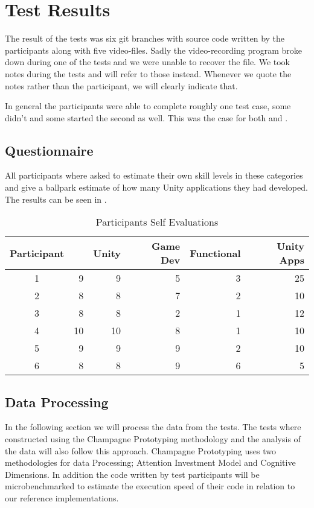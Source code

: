 \section{Test Results} \label{sec:test-results}
The result of the tests was six git branches with source code written by the participants along with five video-files. Sadly the video-recording program broke down during one of the tests and we were unable to recover the file. We took notes during the tests and will refer to those instead. Whenever we quote the notes rather than the participant, we will clearly indicate that.


In general the participants were able to complete roughly one test case, some didn't and some started the second as well. This was the case for both \fsh and \csh.

\subsection{Questionnaire}
All participants where asked to estimate their own skill levels in these categories and give a ballpark estimate of how many Unity applications they had developed. The results can be seen in .

\begin{table}[H]
\begin{tabular}{| c | r | r | r | r | r |}
	\hline
	\textbf{Participant}&\textbf{\csh}&\textbf{Unity}&\textbf{Game Dev}&\textbf{Functional}&\textbf{Unity Apps} \\ \hline
	1 & 9 & 9 & 5 & 3 & 25 \\ \hline
	2 & 8 & 8 & 7 & 2 & 10 \\ \hline
	3 & 8 & 8 & 2 & 1 & 12 \\ \hline
	4 & 10 & 10 & 8 & 1 & 10 \\ \hline
	5 & 9 & 9 & 9 & 2 & 10 \\ \hline
	6 & 8 & 8 & 9 & 6 & 5 \\ \hline
\end{tabular}
\caption{Participants Self Evaluations}
\label{tab:participant-scores}
\end{table}

\newcommand{\mn}{\newmoon}
\newcommand{\mns}{\fullmoon}

\subsection{Data Processing}
In the following section we will process the data from the tests. The tests where constructed using the Champagne Prototyping methodology and the analysis of the data will also follow this approach. Champagne Prototyping uses two methodologies for data Processing; Attention Investment Model and Cognitive Dimensions. In addition the code written by test participants will be microbenchmarked to estimate the execution speed of their code in relation to our reference implementations.

